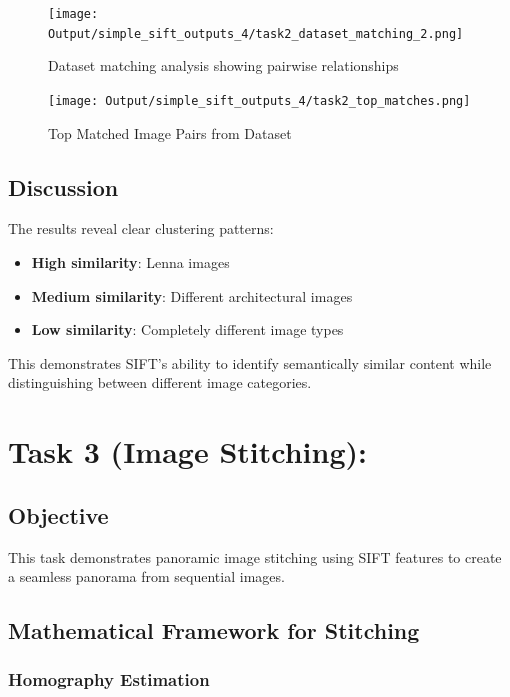 \documentclass[12pt,a4paper]{article}
\begin{document}
\begin{figure}[!ht]
\centering
\texttt{[image: Output/simple\_sift\_outputs\_4/task2\_dataset\_matching\_2.png]}
\caption{Dataset matching analysis showing pairwise relationships}
\label{fig:dataset_matching}
\end{figure}

\begin{figure}[!ht]
\centering
\texttt{[image: Output/simple\_sift\_outputs\_4/task2\_top\_matches.png]}
\caption{Top Matched Image Pairs from Dataset}
\label{fig:dataset_matching}
\end{figure}

\subsection{Discussion}

The results reveal clear clustering patterns:
\begin{itemize}
    \item \textbf{High similarity}: Lenna images
    \item \textbf{Medium similarity}: Different architectural images
    \item \textbf{Low similarity}: Completely different image types
\end{itemize}

This demonstrates SIFT's ability to identify semantically similar content while distinguishing between different image categories.

\section{Task 3 (Image Stitching):}

\subsection{Objective}

This task demonstrates panoramic image stitching using SIFT features to create a seamless panorama from sequential images.

\subsection{Mathematical Framework for Stitching}

\subsubsection{Homography Estimation}
\end{document}
